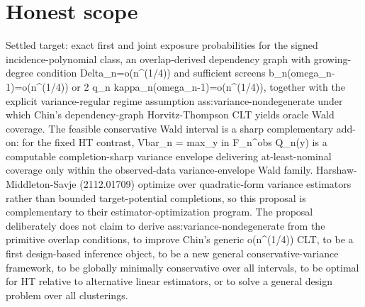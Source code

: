 \documentclass{article}
\begin{document}
\section{Honest scope}

Settled target: exact first and joint exposure probabilities for the signed incidence-polynomial class, an overlap-derived dependency graph with growing-degree condition Delta_n=o(n^(1/4)) and sufficient screens b_n(omega_n-1)=o(n^(1/4)) or 2 q_n kappa_n(omega_n-1)=o(n^(1/4)), together with the explicit variance-regular regime assumption ass:variance-nondegenerate under which Chin's dependency-graph Horvitz-Thompson CLT yields oracle Wald coverage. The feasible conservative Wald interval is a sharp complementary add-on: for the fixed HT contrast, Vbar_n = max_{y in F_n^obs} Q_n(y) is a computable completion-sharp variance envelope delivering at-least-nominal coverage only within the observed-data variance-envelope Wald family. Harshaw-Middleton-Savje (2112.01709) optimize over quadratic-form variance estimators rather than bounded target-potential completions, so this proposal is complementary to their estimator-optimization program. The proposal deliberately does not claim to derive ass:variance-nondegenerate from the primitive overlap conditions, to improve Chin's generic o(n^(1/4)) CLT, to be a first design-based inference object, to be a new general conservative-variance framework, to be globally minimally conservative over all intervals, to be optimal for HT relative to alternative linear estimators, or to solve a general design problem over all clusterings.
\end{document}
